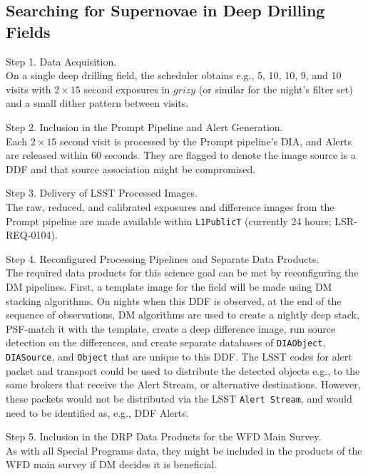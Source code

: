 \documentclass[DM,lsstdoc,toc]{lsstdoc}
\begin{document}
%

\subsection{Searching for Supernovae in Deep Drilling Fields}\label{ssec:SPCS_SNDDF}

Step 1. Data Acquisition. \\
On a single deep drilling field, the scheduler obtains e.g., 5, 10, 10, 9, and 10 visits with $2\times15$ second exposures in $grizy$ (or similar for the night's filter set) and a small dither pattern between visits.

Step 2. Inclusion in the Prompt Pipeline and Alert Generation. \\
Each $2\times15$ second visit is processed by the Prompt pipeline's DIA, and Alerts are released within 60 seconds. They are flagged to denote the image source is a DDF and that source association might be compromised.

Step 3. Delivery of LSST Processed Images. \\
The raw, reduced, and calibrated exposures and difference images from the Prompt pipeline are made available within \texttt{L1PublicT} (currently 24 hours; LSR-REQ-0104).

Step 4. Reconfigured Processing Pipelines and Separate Data Products. \\
The required data products for this science goal can be met by reconfiguring the DM pipelines. First, a template image for the field will be made using DM stacking algorithms. On nights when this DDF is observed, at the end of the sequence of observations, DM algorithms are used to create a nightly deep stack, PSF-match it with the template, create a deep difference image, run source detection on the differences, and create separate databases of \texttt{DIAObject}, \texttt{DIASource}, and \texttt{Object} that are unique to this DDF. The LSST codes for alert packet and transport could be used to distribute the detected objects e.g., to the same brokers that receive the Alert Stream, or alternative destinations. However, these packets would not be distributed via the LSST {\tt Alert Stream}, and would need to be identified as, e.g., DDF Alerts.

Step 5. Inclusion in the DRP Data Products for the WFD Main Survey. \\
As with all Special Programs data, they might be included in the products of the WFD main survey if DM decides it is beneficial.
\end{document}
